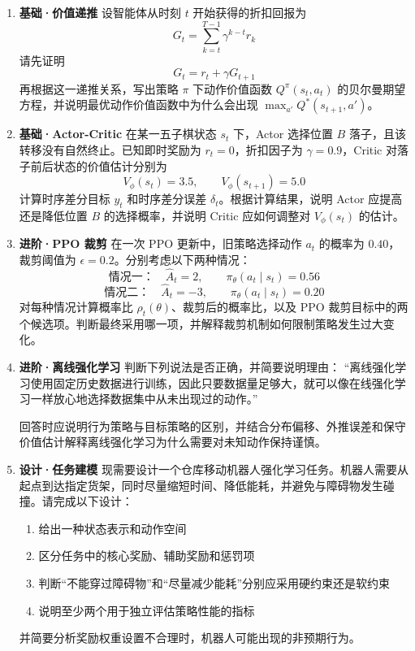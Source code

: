 \begin{exercisebox}
  \begin{enumerate}
    \item \textbf{基础·价值递推} 设智能体从时刻 $t$ 开始获得的折扣回报为
    \[
    G_t=\sum_{k=t}^{T-1}\gamma^{k-t}r_k
    \]
    请先证明
    \[
    G_t=r_t+\gamma G_{t+1}
    \]
    再根据这一递推关系，写出策略 $\pi$ 下动作价值函数 $Q^\pi(s_t,a_t)$ 的贝尔曼期望方程，并说明最优动作价值函数中为什么会出现
    $\max_{a'}Q^*(s_{t+1},a')$。

    \item \textbf{基础·Actor-Critic} 在某一五子棋状态 $s_t$ 下，Actor 选择位置 $B$ 落子，且该转移没有自然终止。已知即时奖励为
    $r_t=0$，折扣因子为 $\gamma=0.9$，Critic 对落子前后状态的价值估计分别为
    \[
    V_\phi(s_t)=3.5,\qquad V_\phi(s_{t+1})=5.0
    \]
    计算时序差分目标 $y_t$ 和时序差分误差 $\delta_t$。根据计算结果，说明 Actor 应提高还是降低位置 $B$ 的选择概率，并说明 Critic 应如何调整对 $V_\phi(s_t)$ 的估计。

    \item \textbf{进阶·PPO 裁剪} 在一次 PPO 更新中，旧策略选择动作 $a_t$ 的概率为 $0.40$，裁剪阈值为
    $\epsilon=0.2$。分别考虑以下两种情况：
    \[
    \text{情况一：}\quad \widehat{A}_t=2,\qquad \pi_\theta(a_t\mid s_t)=0.56
    \]
    \[
    \text{情况二：}\quad \widehat{A}_t=-3,\qquad \pi_\theta(a_t\mid s_t)=0.20
    \]
    对每种情况计算概率比 $\rho_t(\theta)$、裁剪后的概率比，以及 PPO 裁剪目标中的两个候选项。判断最终采用哪一项，并解释裁剪机制如何限制策略发生过大变化。

    \item \textbf{进阶·离线强化学习} 判断下列说法是否正确，并简要说明理由：  
    “离线强化学习使用固定历史数据进行训练，因此只要数据量足够大，就可以像在线强化学习一样放心地选择数据集中从未出现过的动作。”

    回答时应说明行为策略与目标策略的区别，并结合分布偏移、外推误差和保守价值估计解释离线强化学习为什么需要对未知动作保持谨慎。

    \item \textbf{设计·任务建模} 现需要设计一个仓库移动机器人强化学习任务。机器人需要从起点到达指定货架，同时尽量缩短时间、降低能耗，并避免与障碍物发生碰撞。请完成以下设计：
    \begin{enumerate}
      \item 给出一种状态表示和动作空间
      \item 区分任务中的核心奖励、辅助奖励和惩罚项
      \item 判断“不能穿过障碍物”和“尽量减少能耗”分别应采用硬约束还是软约束
      \item 说明至少两个用于独立评估策略性能的指标
    \end{enumerate}
    并简要分析奖励权重设置不合理时，机器人可能出现的非预期行为。


\end{enumerate}
\end{exercisebox}
